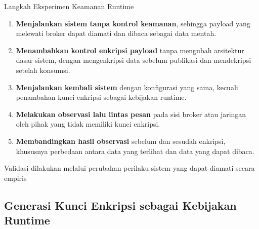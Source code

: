 \documentclass[aspectratio=169, table]{beamer}
\begin{document}
\begin{frame}{Langkah Eksperimen Keamanan Runtime}
	\vspace{10pt}
	\begin{enumerate}\small
		\item \textbf{Menjalankan sistem tanpa kontrol keamanan},
		      sehingga payload yang melewati broker dapat diamati dan dibaca sebagai data mentah.
		\item \textbf{Menambahkan kontrol enkripsi payload}
		      tanpa mengubah arsitektur dasar sistem, dengan mengenkripsi data sebelum publikasi dan mendekripsi setelah konsumsi.
		\item \textbf{Menjalankan kembali sistem}
		      dengan konfigurasi yang sama, kecuali penambahan kunci enkripsi sebagai kebijakan runtime.
		\item \textbf{Melakukan observasi lalu lintas pesan}
		      pada sisi broker atau jaringan oleh pihak yang tidak memiliki kunci enkripsi.
		\item \textbf{Membandingkan hasil observasi}
		      sebelum dan sesudah enkripsi, khususnya perbedaan antara data yang terlihat dan data yang dapat dibaca.
	\end{enumerate}
	
	\vspace{6pt}
	{\footnotesize Validasi dilakukan melalui perubahan perilaku sistem yang dapat diamati secara empiris}
\end{frame}

\subsection*{Generasi Kunci Enkripsi sebagai Kebijakan Runtime}
\end{document}
